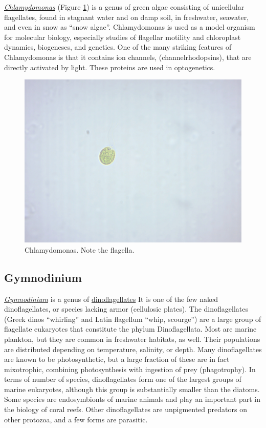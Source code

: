 \href{https://en.wikipedia.org/wiki/Chlamydomonas}{\emph{Chlamydomonas}}
(Figure \ref{fig:chlamydomonaslive}) is a genus of green algae
consisting of unicellular flagellates, found in stagnant water and on
damp soil, in freshwater, seawater, and even in snow as ``snow algae''.
Chlamydomonas is used as a model organism for molecular biology,
especially studies of flagellar motility and chloroplast dynamics,
biogeneses, and genetics. One of the many striking features of
Chlamydomonas is that it contains ion channels, (channelrhodopsins),
that are directly activated by light. These proteins are used in
optogenetics.

\begin{figure}

{\centering \includegraphics[width=0.7\linewidth]{./figures/protists/chlamydomonas_live} 

}

\caption{Chlamydomonas. Note the flagella.}\label{fig:chlamydomonaslive}
\end{figure}

\subsection{Gymnodinium}\label{gymnodinium}

\href{https://en.wikipedia.org/wiki/Gymnodinium}{\emph{Gymnodinium}} is
a genus of
\href{https://en.wikipedia.org/wiki/Dinoflagellate}{dinoflagellates} It
is one of the few naked dinoflagellates, or species lacking armor
(cellulosic plates). The dinoflagellates (Greek dinos ``whirling'' and
Latin flagellum ``whip, scourge'') are a large group of flagellate
eukaryotes that constitute the phylum Dinoflagellata. Most are marine
plankton, but they are common in freshwater habitats, as well. Their
populations are distributed depending on temperature, salinity, or
depth. Many dinoflagellates are known to be photosynthetic, but a large
fraction of these are in fact mixotrophic, combining photosynthesis with
ingestion of prey (phagotrophy). In terms of number of species,
dinoflagellates form one of the largest groups of marine eukaryotes,
although this group is substantially smaller than the diatoms. Some
species are endosymbionts of marine animals and play an important part
in the biology of coral reefs. Other dinoflagellates are unpigmented
predators on other protozoa, and a few forms are parasitic.

